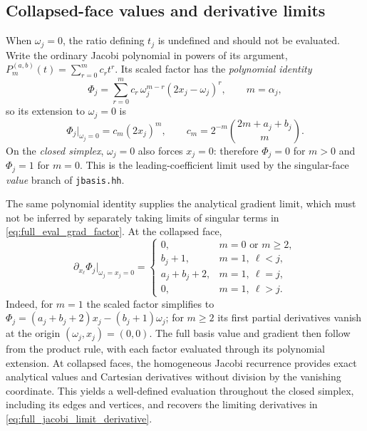 \documentclass[11pt]{article}
\begin{document}
\subsection{Collapsed-face values and derivative limits}
\label{sec:full_basis_limit}
When $\omega_j=0$, the ratio defining $t_j$ is undefined and should
not be evaluated.  Write the ordinary Jacobi polynomial in powers of
its argument, $P_m^{(a,b)}(t)=\sum_{r=0}^m c_rt^r$.  Its scaled
factor has the \emph{polynomial identity}
\begin{equation}\label{eq:full_jacobi_face_limit}
 \Phi_j=\sum_{r=0}^{m}c_r\,
   \omega_j^{m-r}(2x_j-\omega_j)^r,\qquad m=\alpha_j,
\end{equation}
so its extension to $\omega_j=0$ is
\begin{equation}\label{eq:full_jacobi_leading}
 \Phi_j\big|_{\omega_j=0}=c_m(2x_j)^m,\qquad
 c_m=2^{-m}\binom{2m+a_j+b_j}{m}.
\end{equation}
On the \emph{closed simplex}, $\omega_j=0$ also forces $x_j=0$:
therefore $\Phi_j=0$ for $m>0$ and $\Phi_j=1$ for $m=0$.
This is the leading-coefficient limit used by the singular-face
\emph{value} branch of \texttt{jbasis.hh}.

The same polynomial identity supplies the analytical gradient limit,
which must not be inferred by separately taking limits of singular
terms in \eqref{eq:full_eval_grad_factor}.  At the collapsed face,
\begin{equation}\label{eq:full_jacobi_limit_derivative}
 \partial_{x_\ell}\Phi_j\big|_{\omega_j=x_j=0}
 =\begin{cases}
 0,&m=0\text{ or }m\ge2,\\
 b_j+1,&m=1,\ \ell<j,\\
 a_j+b_j+2,&m=1,\ \ell=j,\\
 0,&m=1,\ \ell>j.
 \end{cases}
\end{equation}
Indeed, for $m=1$ the scaled factor simplifies to
$\Phi_j=(a_j+b_j+2)x_j-(b_j+1)\omega_j$; for $m\ge2$ its
first partial derivatives vanish at the origin $(\omega_j,x_j)=(0,0)$.
The full basis value and gradient then follow from the product rule,
with each factor evaluated through its polynomial extension.
At collapsed faces, the homogeneous Jacobi recurrence provides exact
analytical values and Cartesian derivatives without division by the
vanishing coordinate. This yields a well-defined evaluation throughout
the closed simplex, including its edges and vertices, and recovers
the limiting derivatives in
\eqref{eq:full_jacobi_limit_derivative}.
\end{document}
